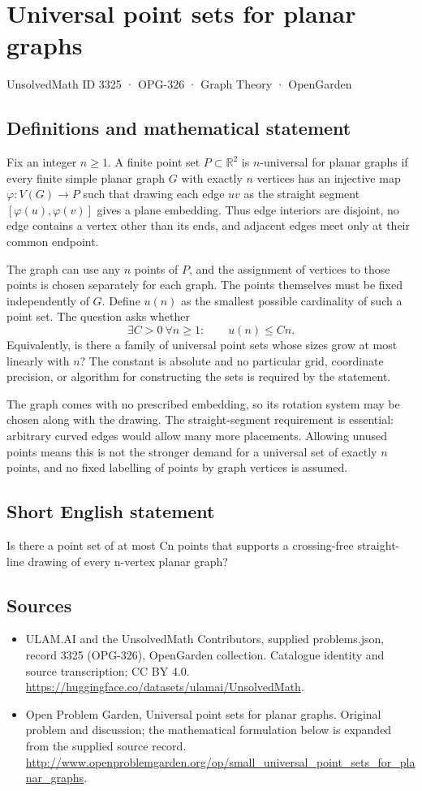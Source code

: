 \documentclass[11pt,a4paper]{article}
\begin{document}
\section*{Universal point sets for planar graphs}\label{3325}
{\small UnsolvedMath ID 3325 · OPG-326 · Graph Theory · OpenGarden}
\subsection{Definitions and mathematical statement}
Fix an integer $n\ge1$. A finite point set $P\subset\mathbb R^2$ is
$n$-universal for planar graphs if every finite simple planar graph
$G$ with exactly $n$ vertices has an injective map
$\varphi:V(G)\to P$ such that drawing each edge $uv$ as the straight
segment $[\varphi(u),\varphi(v)]$ gives a plane embedding. Thus edge
interiors are disjoint, no edge contains a vertex other than its
ends, and adjacent edges meet only at their common endpoint.

The graph can use any $n$ points of $P$, and the assignment of
vertices to those points is chosen separately for each graph.
The points themselves must be fixed independently of $G$.
Define $u(n)$ as the smallest possible cardinality of such a point
set. The question asks whether
\[
                  \exists C>0\ \forall n\ge1:\qquad u(n)\le Cn.
\]
Equivalently, is there a family of universal point sets whose sizes
grow at most linearly with $n$? The constant is absolute and no
particular grid, coordinate precision, or algorithm for constructing
the sets is required by the statement.

The graph comes with no prescribed embedding, so its rotation
system may be chosen along with the drawing. The straight-segment
requirement is essential: arbitrary curved edges would allow many
more placements. Allowing unused points means this is not the
stronger demand for a universal set of exactly $n$ points, and no
fixed labelling of points by graph vertices is assumed.
\subsection{Short English statement}
Is there a point set of at most Cn points that supports a crossing-free straight-line drawing of every n-vertex planar graph?
\subsection{Sources}
\begin{itemize}
\item[S1] ULAM.AI and the UnsolvedMath Contributors, supplied problems.json, record 3325 (OPG-326), OpenGarden collection. Catalogue identity and source transcription; CC BY 4.0.
\url{https://huggingface.co/datasets/ulamai/UnsolvedMath}.
\item[S2] Open Problem Garden, Universal point sets for planar graphs. Original problem and discussion; the mathematical formulation below is expanded from the supplied source record.
\url{http://www.openproblemgarden.org/op/small_universal_point_sets_for_planar_graphs}.
\end{itemize}
\end{document}
